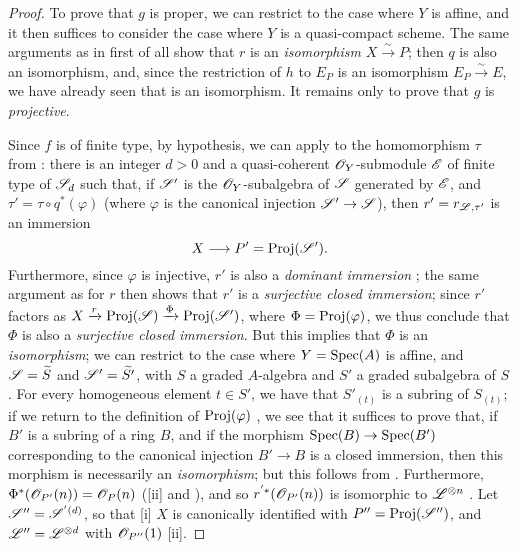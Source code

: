 \begin{proof}
To prove that $g$ is proper, we can restrict to the case where $Y$ is affine, and it then suffices to consider the case where $Y$ is a quasi-compact scheme.
The same arguments as in  first of all show that $r$ is an \emph{isomorphism} $X\xrightarrow{\sim}P$;
then $q$ is also an isomorphism, and, since the restriction of $h$ to $E_P$ is an isomorphism $E_P\xrightarrow{\sim}E$, we have already seen that  is an isomorphism.
It remains only to prove that $g$ is \emph{projective}.

Since $f$ is of finite type, by hypothesis, we can apply  to the homomorphism
$\tau$ from :
there is an integer $d>0$ and a quasi-coherent $\mathscr{O}_Y$-submodule $\mathscr{E}$ of finite type of $\mathscr{S}_d$ such that, if $\mathscr{S}'$ is the $\mathscr{O}_Y$-subalgebra of $\mathscr{S}$ generated by $\mathscr{E}$, and $\tau'=\tau\circ q^*(\varphi)$ (where $\varphi$ is the canonical injection $\sh{S}'\to\sh{S}$), then $r'=r_{\mathscr{L},\tau'}$ is an immersion
\[
  X\to P'=\Proj(\sh{S}').
\]
Furthermore, since $\varphi$ is injective, $r'$ is also a \emph{dominant immersion} ;
the same argument as for $r$ then shows that $r'$ is a \emph{surjective closed immersion};
since $r'$ factors as $X\xrightarrow{r}\operatorname{Proj}(\mathscr{S})\xrightarrow{\Phi}\operatorname{Proj}(\mathscr{S}')$, where $\Phi=\operatorname{Proj}(\varphi)$, we thus conclude that $\Phi$ is also a \emph{surjective closed immersion}.
But this implies that $\Phi$ is an \emph{isomorphism};
we can restrict to the case where $Y=\operatorname{Spec}(A)$ is affine, and $\mathscr{S}=\widetilde{S}$ and $\mathscr{S}'=\widetilde{S'}$, with $S$ a graded $A$-algebra and $S'$ a graded subalgebra of $S$.
For every homogeneous element $t\in S'$, we have that $S'_{(t)}$ is a subring of $S_{(t)}$;
if we return to the definition of $\operatorname{Proj}(\varphi)$ , we see that it suffices to prove that, if $B'$ is a subring of a ring $B$, and if the morphism $\Spec(B)\to\Spec(B')$ corresponding to the canonical injection $B'\to B$ is a closed immersion, then this morphism is necessarily an \emph{isomorphism};
but this follows from .
Furthermore, $\Phi^*(\mathscr{O}_{P'}(n))=\mathscr{O}_P(n)$ ([ii] and ), and so $r^{'*}(\mathscr{O}_{P'}(n))$ is isomorphic to $\mathscr{L}^{\otimes n}$ .
Let $\mathscr{S}''=\mathscr{S}^{'(d)}$, so that [i] $X$ is canonically identified with $P''=\operatorname{Proj}(\mathscr{S}'')$, and $\mathscr{L}''=\mathscr{L}^{\otimes d}$ with $\mathscr{O}_{P''}(1)$ [ii].


\end{proof}

